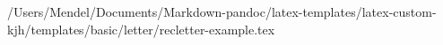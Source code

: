 /Users/Mendel/Documents/Markdown-pandoc/latex-templates/latex-custom-kjh/templates/basic/letter/recletter-example.tex